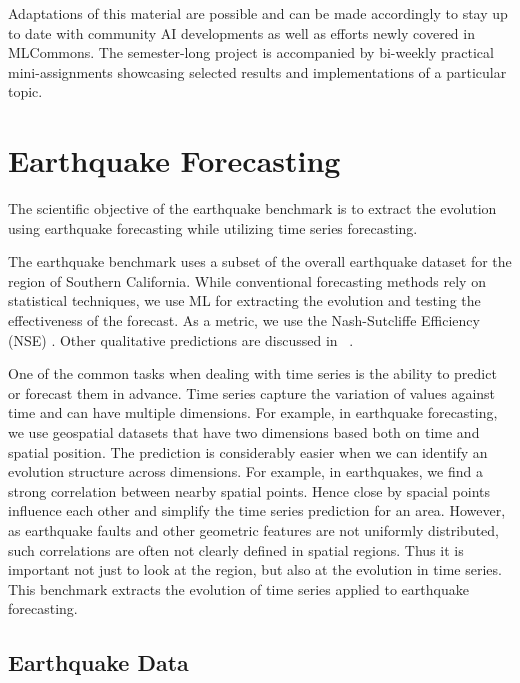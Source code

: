\documentclass[utf8]{FrontiersinVancouver} %
\begin{document}
 Adaptations of this material are possible and can be made accordingly
 to stay up to date with community AI developments as well as efforts
 newly covered in MLCommons. The semester-long project is accompanied
 by bi-weekly practical mini-assignments showcasing selected results
 and implementations of a particular topic.

\section{Earthquake Forecasting}
\label{sec:eq}

The scientific objective of the earthquake benchmark is to extract the
evolution using earthquake forecasting while utilizing time series forecasting.

The earthquake benchmark uses a subset of the overall earthquake
dataset for the region of Southern California. While conventional
forecasting methods rely on statistical techniques, we use ML
for extracting the evolution and testing the effectiveness of the
forecast.  As a metric, we use the Nash-Sutcliffe Efficiency (NSE)
\citep{nash-79}.  Other qualitative predictions are discussed in
~\citep{fox2022-jm}.

One of the common tasks when dealing with time series is the ability
to predict or forecast them in advance. Time series capture the
variation of values against time and can have multiple dimensions. For
example, in earthquake forecasting, we use geospatial datasets that have
two dimensions based both on time and spatial position. The prediction
is considerably easier when we can identify an evolution structure
across dimensions. For example, in earthquakes, we find a strong
correlation between nearby spatial points. Hence close by spacial
points influence each other and simplify the time series prediction
for an area. However, as earthquake faults and other geometric features
are not uniformly distributed, such correlations are often not clearly
defined in spatial regions. Thus it is important not just to look at
the region, but also at the evolution in time series. This benchmark
extracts the evolution of time series applied to earthquake forecasting.


\subsection{Earthquake Data}
\end{document}
